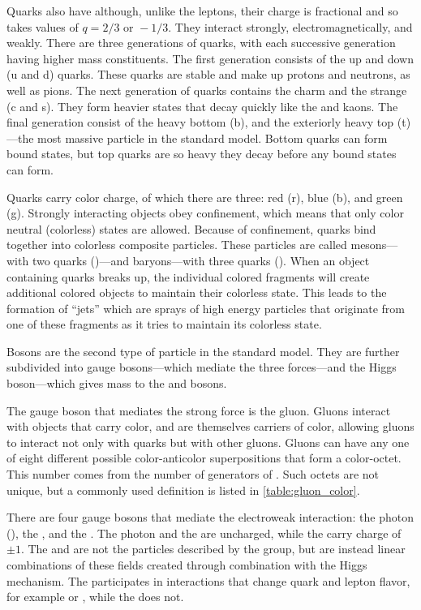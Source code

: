 Quarks also have \spinhalf although, unlike the leptons, their charge is
fractional and so takes values of $q = 2/3 \text{ or } -1/3$. They interact
strongly, electromagnetically, and weakly. There are three generations of
quarks, with each successive generation having higher mass constituents. The
first generation consists of the up and down (u and d) quarks. These quarks are
stable and make up protons and neutrons, as well as pions. The next generation
of quarks contains the charm and the strange (c and s). They form heavier
states that decay quickly like the \jpsi and kaons. The final generation
consist of the heavy bottom (b), and the exteriorly heavy top (t)---the most
massive particle in the standard model. Bottom quarks can form bound states,
but top quarks are so heavy they decay before any bound states can form.

Quarks carry color charge, of which there are three: red (r),
blue (b), and green (g). Strongly interacting objects obey confinement, which
means that only color neutral (colorless) states are allowed. Because of
confinement, quarks bind together into colorless composite particles. These
particles are called mesons---with two quarks (\qqbar)---and baryons---with
three quarks (\baryon). When an object containing quarks breaks up, the
individual colored fragments will create additional colored objects to maintain
their colorless state. This leads to the formation of ``jets'' which are sprays
of high energy particles that originate from one of these fragments as it tries
to maintain its colorless state.

Bosons are the second type of particle in the standard model. They are further
subdivided into gauge bosons---which mediate the three forces---and the Higgs
boson---which gives mass to the \W and \Z bosons.

The gauge boson that mediates the strong force is the gluon. Gluons interact
with objects that carry color, and are themselves carriers of color, allowing
gluons to interact not only with quarks but with other gluons. Gluons can have
any one of eight different possible color-anticolor superpositions that form a
color-octet. This number comes from the number of generators of \SUthree. Such
octets are not unique, but a commonly used definition is listed in
\cref{table:gluon_color}.



There are four gauge bosons that mediate the electroweak interaction: the photon
(\photon), the \Z, and the \Wpm. The photon and the \Z are uncharged, while the
\Wpm carry charge of $\pm1$. The \W and \Z are not the particles described by
the \SUtwoUone group, but are instead linear combinations of these fields
created through combination with the Higgs mechanism. The \W participates in
interactions that change quark and lepton flavor, for example \ttoWb or
\mutoWnu, while the \Z does not.

